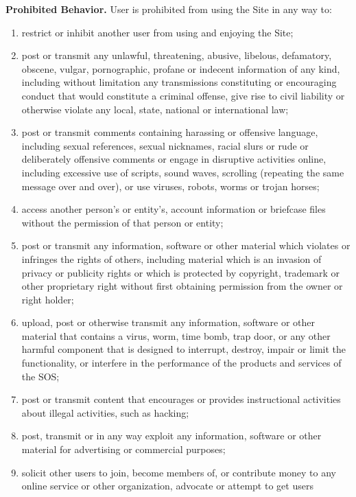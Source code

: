 \textbf{Prohibited Behavior.}
User is prohibited from using the Site in any way to:
\begin{enumerate}[label = \EnumerateLabel]
    \item restrict or inhibit another user from using and enjoying the Site;
    \item post or transmit any unlawful, threatening, abusive, libelous,
    defamatory, obscene, vulgar, pornographic, profane or indecent information
    of any kind, including without limitation any transmissions constituting or
    encouraging conduct that would constitute a criminal offense, give rise to
    civil liability or otherwise violate any local, state, national or
    international law;
    \item post or transmit comments containing harassing or offensive language,
    including sexual references, sexual nicknames, racial slurs or rude or
    deliberately offensive comments or engage in disruptive activities online,
    including excessive use of scripts, sound waves, scrolling (repeating the
    same message over and over), or use viruses, robots, worms or trojan horses;
    \item access another person's or entity's, account information or briefcase
    files without the permission of that person or entity;
    \item post or transmit any information, software or other material which
    violates or infringes the rights of others, including material which is an
    invasion of privacy or publicity rights or which is protected by copyright,
    trademark or other proprietary right without first obtaining permission from
    the owner or right holder;
    \item upload, post or otherwise transmit any information, software or other
    material that contains a virus, worm, time bomb, trap door, or any other
    harmful component that is designed to interrupt, destroy, impair or limit
    the functionality, or interfere in the performance of the products and
    services of the SOS;
    \item post or transmit content that encourages or provides instructional
    activities about illegal activities, such as hacking;
    \item post, transmit or in any way exploit any information, software or
    other material for advertising or commercial purposes;
    \item solicit other users to join, become members of, or contribute money to
    any online service or other organization, advocate or attempt to get users

\end{enumerate}
